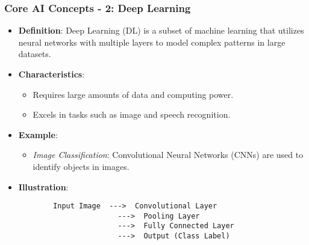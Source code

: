 \documentclass{beamer}
\begin{document}
\begin{frame}[fragile]
    \frametitle{Core AI Concepts - 2: Deep Learning}
    \begin{itemize}
        \item \textbf{Definition}: Deep Learning (DL) is a subset of machine learning that utilizes neural networks with multiple layers to model complex patterns in large datasets.
        
        \item \textbf{Characteristics}:
        \begin{itemize}
            \item Requires large amounts of data and computing power.
            \item Excels in tasks such as image and speech recognition.
        \end{itemize}
        
        \item \textbf{Example}: 
        \begin{itemize}
            \item \textit{Image Classification}: Convolutional Neural Networks (CNNs) are used to identify objects in images.
        \end{itemize}
        
        \item \textbf{Illustration}: 
        \begin{lstlisting}
        Input Image  --->  Convolutional Layer  
                       --->  Pooling Layer  
                       --->  Fully Connected Layer  
                       --->  Output (Class Label)
        \end{lstlisting}
    \end{itemize}
\end{frame}
\end{document}
